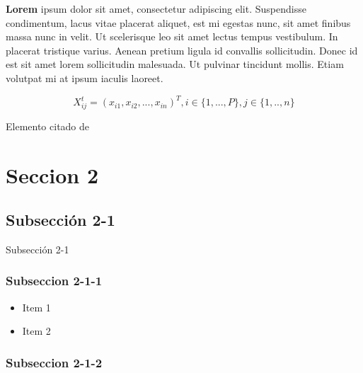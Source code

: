 \documentclass[runningheads]{llncs}
\begin{document}
\textbf{Lorem} ipsum dolor sit amet, consectetur adipiscing elit. Suspendisse condimentum, lacus vitae placerat aliquet, est mi egestas nunc, sit amet finibus massa nunc in velit. Ut scelerisque leo sit amet lectus tempus vestibulum. In placerat tristique varius. Aenean pretium ligula id convallis sollicitudin. Donec id est sit amet lorem sollicitudin malesuada. Ut pulvinar tincidunt mollis. Etiam volutpat mi at ipsum iaculis laoreet.

\begin{equation}
    X_{ij}^{t}=(x_{i1},x_{i2},...,x_{in})^T,  i \in \{1,...,P\}, j \in \{1,..,n\}
\end{equation}

Elemento citado de \cite{almeida}

\section{Seccion 2}

\subsection{Subsección 2-1}
Subsección 2-1 

\subsubsection{Subseccion 2-1-1}

\begin{itemize}
    \item Item 1
    \item Item 2
\end{itemize}

\subsubsection{Subseccion 2-1-2}
\end{document}
